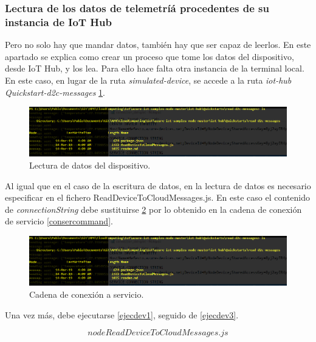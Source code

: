 \documentclass[10pt]{article}
\begin{document}
\subsubsection{Lectura de los datos de telemetríá procedentes de su instancia de
IoT Hub}

Pero no solo hay que mandar datos, también hay que ser capaz de leerlos. En este
apartado se explica como crear un proceso que tome los datos del dispositivo,
desde IoT Hub, y los lea. Para ello hace falta otra instancia de la terminal
local. En este caso, en lugar de la ruta \textit{simulated-device}, se accede a
la ruta \textit{iot-hub\\Quickstart\read-d2c-messages}
\hyperref[directoryreader]{\ref{directoryreader}}.

\begin{figure}[h!]
 \includegraphics[width=\linewidth]{./IoT/MicrosoftAzure/5-1_read_telemetry.png}
 \caption{Lectura de datos del dispositivo.}
 \label{directoryreader}
\end{figure}

Al igual que en el caso de la escritura de datos, en la lectura de datos es
necesario especificar en el fichero ReadDeviceToCloudMessages.js. En este caso
el contenido de \textit{connectionString} debe sustituirse
\hyperref[codestringser]{\ref{codestringser}} por lo obtenido en la cadena de 
conexión de servicio \hyperref[consercommand]{\ref{consercommand}}.

\begin{figure}[h!]
 \includegraphics[width=\linewidth]{./IoT/MicrosoftAzure/5-1_read_telemetry.png}
 \caption{Cadena de conexión a servicio.}
 \label{codestringser}
\end{figure}

Una vez más, debe ejecutarse \hyperref[ejecdev1]{\ref{ejecdev1}}, seguido de
\hyperref[ejecdev3]{\ref{ejecdev3}}.

\begin{equation}
 \label{ejecdev3}
node ReadDeviceToCloudMessages.js
\end{equation}
\end{document}
